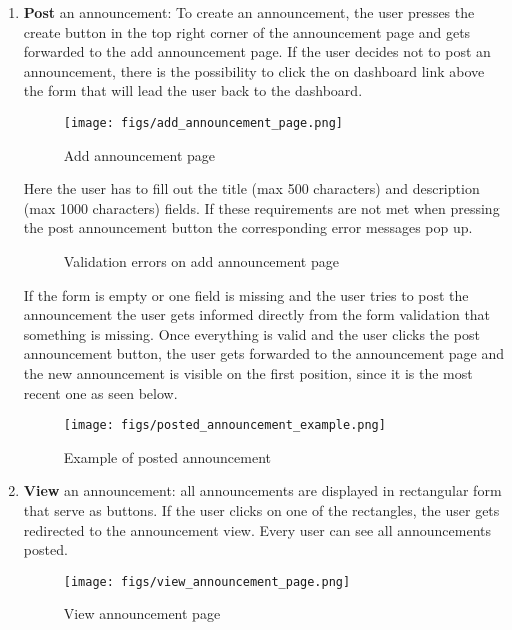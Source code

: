 \documentclass[conference]{IEEEtran}
\begin{document}
\begin{enumerate}
    \item \textbf{Post} an announcement: To create an announcement, the user presses the create button in the top right corner of the announcement page and gets forwarded to the add announcement page. If the user decides not to post an announcement, there is the possibility to click the on dashboard link above the form that will lead the user back to the dashboard.
    \begin{figure}[H]
    \centering
    \texttt{[image: figs/add\_announcement\_page.png]}
    \caption{Add announcement page}
    \label{fig:Add announcement page}
    \end{figure}
    Here the user has to fill out the title (max 500 characters) and description (max 1000 characters) fields. If these requirements are not met when pressing the post announcement button the corresponding error messages pop up.
    \begin{figure}[H]
    \centering
    \caption{Validation errors on add announcement page}
    \label{fig:Validation errors on add announcement page}
    \end{figure}
    If the form is empty or one field is missing and the user tries to post the announcement the user gets informed directly from the form validation that something is missing. Once everything is valid and the user clicks the post announcement button, the user gets forwarded to the announcement page and the new announcement is visible on the first position, since it is the most recent one as seen below.
    \begin{figure}[H]
    \centering
    \texttt{[image: figs/posted\_announcement\_example.png]}
    \caption{Example of posted announcement}
    \label{fig:Example of posted announcement}
    \end{figure}
    \item \textbf{View} an announcement: all announcements are displayed in rectangular form that serve as buttons. If the user clicks on one of the rectangles, the user gets redirected to the announcement view. Every user can see all announcements posted.
    \begin{figure}[H]
    \centering
    \texttt{[image: figs/view\_announcement\_page.png]}
    \caption{View announcement page}
    \label{fig:View announcement page}

\end{figure}
\end{enumerate}
\end{document}

